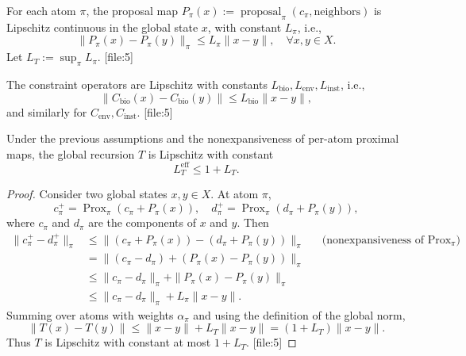 \documentclass[11pt]{article}
\begin{document}
\begin{assumption}
For each atom \(\pi\), the proposal map \(P_\pi(x) := \operatorname{proposal}_\pi(c_\pi,\text{neighbors})\) is Lipschitz continuous in the global state \(x\), with constant \(L_\pi\), i.e.,
\[
  \|P_\pi(x) - P_\pi(y)\|_\pi \leq L_\pi \|x-y\|,\quad \forall x,y\in X.
\]
Let \(L_T := \sup_\pi L_\pi\). [file:5]
\end{assumption}

\begin{assumption}
The constraint operators are Lipschitz with constants \(L_{\text{bio}}, L_{\text{env}}, L_{\text{inst}}\), i.e.,
\[
  \|C_{\text{bio}}(x) - C_{\text{bio}}(y)\| \leq L_{\text{bio}} \|x-y\|,
\]
and similarly for \(C_{\text{env}}, C_{\text{inst}}\). [file:5]
\end{assumption}

\begin{lemma}
Under the previous assumptions and the nonexpansiveness of per-atom proximal maps, the global recursion \(T\) is Lipschitz with constant
\[
  L_T^{\text{eff}} \leq 1 + L_T.
\]
\label{lem:Lipschitz-T}
\end{lemma}

\begin{proof}
Consider two global states \(x,y\in X\). At atom \(\pi\),
\[
  c_\pi^+ = \operatorname{Prox}_\pi(c_\pi + P_\pi(x)),\quad
  d_\pi^+ = \operatorname{Prox}_\pi(d_\pi + P_\pi(y)),
\]
where \(c_\pi\) and \(d_\pi\) are the components of \(x\) and \(y\). Then
\begin{align*}
  \|c_\pi^+ - d_\pi^+\|_\pi
  &\leq \|(c_\pi + P_\pi(x)) - (d_\pi + P_\pi(y))\|_\pi
  &&\text{(nonexpansiveness of }\operatorname{Prox}_\pi\text{)}\\
  &= \| (c_\pi - d_\pi) + (P_\pi(x) - P_\pi(y)) \|_\pi \\
  &\leq \|c_\pi - d_\pi\|_\pi + \|P_\pi(x) - P_\pi(y)\|_\pi \\
  &\leq \|c_\pi - d_\pi\|_\pi + L_\pi \|x-y\|.
\end{align*}
Summing over atoms with weights \(\alpha_\pi\) and using the definition of the global norm,
\[
  \|T(x) - T(y)\|
  \leq \|x-y\| + L_T \|x-y\|
  = (1 + L_T)\|x-y\|.
\]
Thus \(T\) is Lipschitz with constant at most \(1+L_T\). [file:5]
\end{proof}
\end{document}
